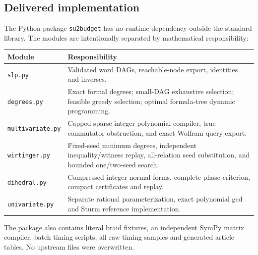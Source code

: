 \documentclass[11pt]{article}
\theoremstyle{definition}
\theoremstyle{remark}
\newcommand{\code}[1]{\texttt{#1}}
\begin{document}
\subsection{Delivered implementation}
The Python package \code{su2budget} has no runtime dependency outside the standard library. The modules are intentionally separated by mathematical responsibility:
\begin{center}\small
\begin{tabular}{@{}p{37mm}p{111mm}@{}}
\toprule
Module & Responsibility\\
\midrule
\code{slp.py} & Validated word DAGs, reachable-node export, identities and inverses.\\
\code{degrees.py} & Exact formal degrees; small-DAG exhaustive selection; feasible greedy selection; optimal formula-tree dynamic programming.\\
\code{multivariate.py} & Capped sparse integer polynomial compiler, true commutator obstruction, and exact Wolfram query export.\\
\code{wirtinger.py} & Fixed-seed minimum degrees, independent inequality/witness replay, all-relation seed substitution, and bounded one/two-seed search.\\
\code{dihedral.py} & Compressed integer normal forms, complete phase criterion, compact certificates and replay.\\
\code{univariate.py} & Separate rational parameterization, exact polynomial gcd and Sturm reference implementation.\\
\bottomrule
\end{tabular}
\end{center}
The package also contains literal braid fixtures, an independent SymPy matrix compiler, batch timing scripts, all raw timing samples and generated article tables. No upstream files were overwritten.
\end{document}
